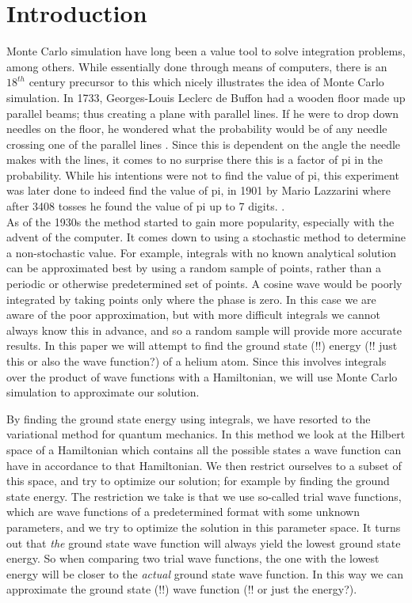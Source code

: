 

\section{Introduction}

Monte Carlo simulation have long been a value tool to solve integration problems, among others. While essentially done through means of computers, there is an $18^{th}$ century precursor to this which nicely illustrates the idea of Monte Carlo simulation. In 1733, Georges-Louis Leclerc de Buffon had a wooden floor made up parallel beams; thus creating a plane with parallel lines. If he were to drop down needles on the floor, he wondered what the probability would be of any needle crossing one of the parallel lines \cite{Buffon}. Since this is dependent on the angle the needle makes with the lines, it comes to no surprise there this is a factor of pi in the probability. While his intentions were not to find the value of pi, this experiment was later done to indeed find the value of pi, in 1901 by Mario Lazzarini where after 3408 tosses he found the value of pi up to 7 digits. \cite{Lazzarini}. \\

As of the 1930s the method started to gain more popularity, especially with the advent of the computer. It comes down to using a stochastic method to determine a non-stochastic value. For example, integrals with no known analytical solution can be approximated best by using a random sample of points, rather than a periodic or otherwise predetermined set of points. A cosine wave would be poorly integrated by taking points only where the phase is zero. In this case we are aware of the poor approximation, but with more difficult integrals we cannot always know this in advance, and so a random sample will provide more accurate results. In this paper we will attempt to find the ground state (!!) energy (!! just this or also the wave function?) of a helium atom. Since this involves integrals over the product of wave functions with a Hamiltonian, we will use Monte Carlo simulation to approximate our solution. 

By finding the ground state energy using integrals, we have resorted to the variational method for quantum mechanics. In this method we look at the Hilbert space of a Hamiltonian which contains all the possible states a wave function can have in accordance to that Hamiltonian. We then restrict ourselves to a subset of this space, and try to optimize our solution; for example by finding the ground state energy. The restriction we take is that we use so-called trial wave functions, which are wave functions of a predetermined format with some unknown parameters, and we try to optimize the solution in this parameter space. It turns out that \textit{the} ground state wave function will always yield the lowest ground state energy. So when comparing two trial wave functions, the one with the lowest energy will be closer to the \textit{actual} ground state wave function. In this way we can approximate the ground state (!!) wave function (!! or just the energy?). \cite{AdvStatMech}

